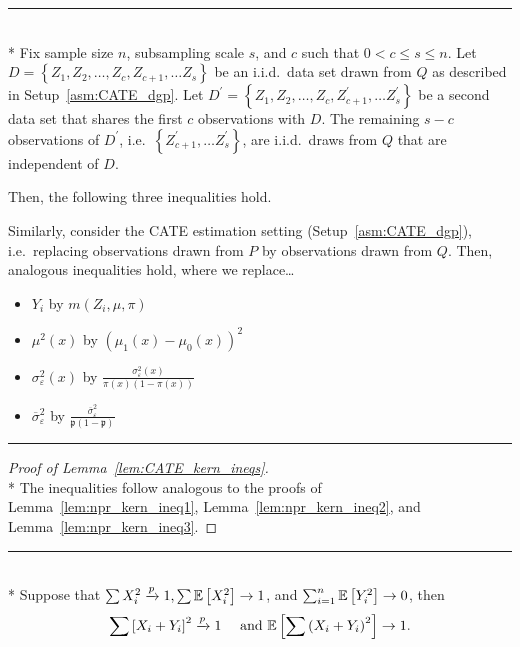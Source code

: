 \hrule

\begin{lem}\label{lem:CATE_kern_ineqs}\mbox{}\\*
	Fix sample size $n$, subsampling scale $s$, and $c$ such that $0 < c \leq s \leq n$.
	Let $D = \left\{Z_1, Z_2, \dotsc, Z_c, Z_{c+1}, \dotsc Z_s \right\}$ be an i.i.d.\ data set drawn from $Q$ as described in Setup~\ref{asm:CATE_dgp}.
	Let $D^{\prime} = \left\{Z_1, Z_2, \dotsc, Z_c, Z_{c+1}^{\prime}, \dotsc Z_s^{\prime} \right\}$ be a second data set that shares the first $c$ observations with $D$.
	The remaining $s - c$ observations of $D^{\prime}$, i.e.\ $\left\{Z_{c+1}^{\prime}, \dotsc Z_s^{\prime} \right\}$, are i.i.d.\ draws from $Q$ that are independent of $D$.

	Then, the following three inequalities hold.

		
	Similarly, consider the CATE estimation setting (Setup~\ref{asm:CATE_dgp}),
	i.e.\ replacing observations drawn from $P$ by observations drawn from $Q$.
	Then, analogous inequalities hold, where we replace\dots
	\begin{multicols}{2}
		\begin{itemize}
			\item $Y_i$ by $m(Z_{i}, \mu, \pi)$
			\item $\mu^2(x)$ by $\left(\mu_1\left(x\right) - \mu_{0}\left(x\right)\right)^2$
			\item $\sigma^{2}_{\varepsilon}(x)$ by $\frac{\sigma_{\varepsilon}^2\left(x\right)}{\pi(x)\left(1 - \pi(x)\right)}$
			\item $\overline{\sigma}^{2}_{\varepsilon}$ by $\frac{\overline{\sigma}^2_{\varepsilon}}{\mathfrak{p}\left(1 - \mathfrak{p}\right)}$
		\end{itemize}
	\end{multicols}
\end{lem}

\hrule

\begin{proof}[Proof of Lemma~\ref{lem:CATE_kern_ineqs}]\mbox{}\\*
	The inequalities follow analogous to the proofs of Lemma~\ref{lem:npr_kern_ineq1}, Lemma~\ref{lem:npr_kern_ineq2}, and Lemma~\ref{lem:npr_kern_ineq3}.
\end{proof}

\hrule

\begin{lem}\label{lem:peng1}\mbox{}\\*
	Suppose that $\sum X_{i}^2 \xrightarrow{p} 1, \sum \mathbb{E}\left[X_{i}^2\right] \rightarrow 1$, and $\sum_{i=1}^n \mathbb{E}\left[Y_{i}^2\right] \rightarrow 0$, then
	\begin{equation}
		\sum\left[X_{i}+Y_{i}\right]^2 \xrightarrow{p} 1 \quad \text { and } \mathbb{E}\left[\sum\left(X_{i}+Y_{i}\right)^2\right] \rightarrow 1.
	\end{equation}
\end{lem}

